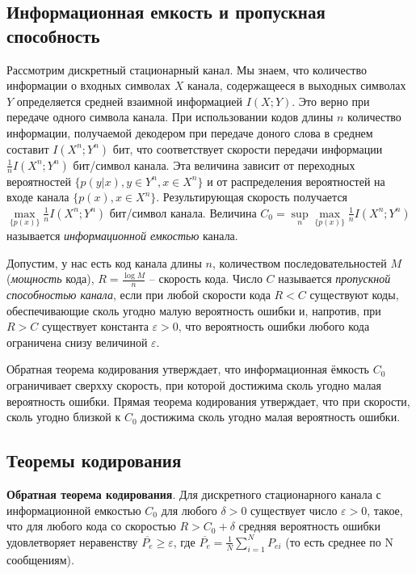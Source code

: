 \documentclass[a4paper,12pt]{article}
\begin{document}
\subsection*{Информационная емкость и пропускная способность}
Рассмотрим дискретный стационарный канал. Мы знаем, что количество информации о входных символах $X$ канала, содержащееся в выходных символах $Y$ определяется средней взаимной информацией $I(X;Y)$. Это верно при передаче одного символа канала. При использовании кодов длины $n$ количество информации, получаемой декодером при передаче доного слова в среднем составит $I(X^n;Y^n)$ бит, что соответствует скорости передачи информации $\frac{1}{n}I(X^n;Y^n)$ бит/символ канала. Эта величина зависит от переходных вероятностей $\{p(y|x), y\in Y^n,x\in X^n\}$ и от распределения вероятностей на входе канала $\{p(x),x\in X^n\}$. Результирующая скорость получается $\max\limits_{\{p(x)\}}\frac{1}{n}I(X^n;Y^n)$ бит/символ канала. Величина $C_0=\sup\limits_n\max\limits_{\{p(x)\}}\frac{1}{n}I(X^n;Y^n)$ называется \textit{информационной емкостью} канала.

Допустим, у нас есть код канала длины $n$, количеством последовательностей $M$ (\textit{мощность} кода), $R=\frac{\log M}{n}$ -- скорость кода. Число $C$ называется \textit{пропускной способностью канала}, если при любой скорости кода $R<C$ существуют коды, обеспечивающие сколь угодно малую вероятность ошибки и, напротив, при $R>C$ существует константа $\varepsilon>0$, что вероятность ошибки любого кода ограничена снизу величиной $\varepsilon$.

Обратная теорема кодирования утверждает, что информационная ёмкость $C_0$ ограничивает сверхху скорость, при которой достижима сколь угодно малая вероятность ошибки. Прямая теорема кодирования утверждает, что при скорости, сколь угодно близкой к $C_0$ достижима сколь угодно малая вероятность ошибки. 

\subsection*{Теоремы кодирования}

\textbf{Обратная теорема кодирования}. Для дискретного стационарного канала с информационной емкостью $C_0$ для любого $\delta>0$ существует число $\varepsilon > 0$, такое, что для любого кода со скоростью $R>C_0+\delta$ средняя вероятность ошибки удовлетворяет неравенству $\overline{P_e}\ge\varepsilon$, где $\overline{P_e}=\frac{1}{N}\sum\limits_{i=1}^{N}P_{ei}$ (то есть среднее по N сообщениям).
\end{document}

